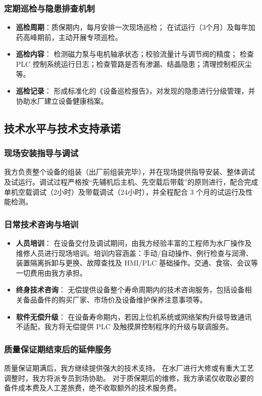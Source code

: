 \documentclass[UTF8,a4paper,12pt,titlepage]{ctexart}
\begin{document}
\subsubsection{定期巡检与隐患排查机制}
\begin{itemize}
    \item \textbf{巡检周期}：质保期内，每月安排一次现场巡检；
        在试运行（3个月）及每年加药高峰期前，主动开展专项巡检。
    \item \textbf{巡检内容}：
        检测磁力泵与电机轴承状态；校验流量计与调节阀的精度；
        检查 PLC 控制系统运行日志；检查管路是否有渗漏、结晶隐患；清理控制柜灰尘等。
    \item \textbf{巡检记录}：
        形成标准化的《设备巡检报告》，对发现的隐患进行分级管理，并协助水厂建立设备健康档案。
\end{itemize}

\subsection{技术水平与技术支持承诺}
\subsubsection{现场安装指导与调试}
我方负责整个设备的组装（出厂前组装完毕），并在现场提供指导安装、整体调试及试运行。调试过程严格按“先辅机后主机、先空载后带载”的原则进行，配合完成单机空载调试（2小时）及带载调试（24小时），并全程配合 3 个月的试运行及性能检测。

\subsubsection{日常技术咨询与培训}
\begin{itemize}
    \item \textbf{人员培训}：
        在设备交付及调试期间，由我方经验丰富的工程师为水厂操作及维修人员进行现场培训。培训内容涵盖：手动/自动操作、例行检查与润滑、装置隔离拆卸与更换、故障查找及 HMI/PLC 基础操作。交通、食宿、会议等一切费用由我方承担。
    \item \textbf{终身技术咨询}：
        无偿提供设备整个寿命周期内的技术咨询服务，包括设备相关备品备件的购买厂家、市场价及设备维护保养注意事项等。
    \item \textbf{软件无偿升级}：
        在设备寿命期内，若因上位机系统或网络架构升级导致通讯不适配，我方将无偿提供 PLC 及触摸屏控制程序的升级与联调服务。
\end{itemize}

\subsubsection{质量保证期结束后的延伸服务}
质量保证期满后，我方继续提供强大的技术支持。
在水厂进行大修或有重大工艺调整时，我方将派专员到场协助。
对于质保期后的维修，我方承诺仅收取必要的备件成本费及人工差旅费，绝不收取额外的技术服务费。
\end{document}
